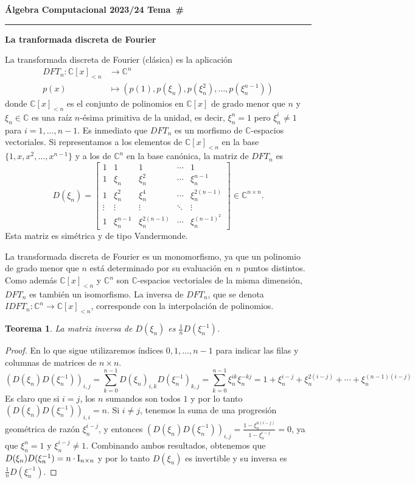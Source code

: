 \documentclass[a4paper, 11pt]{article}
\newcommand{\CC}{\mathbb{C}}
\newcounter{numerodetema}
\newcommand\tema[1]{{\eject\stepcounter{numerodetema}\bf Álgebra Computacional
2023/24 \hfill Tema~\#\arabic{numerodetema}}\par\smallskip\hrule\bigskip\par
\begin{center}{\Large\bf #1}\end{center}}
\theoremstyle{plain}
\newtheorem{teor}{Teorema}[numerodetema]
\theoremstyle{definition}
\begin{document}
\setcounter{numerodetema}{6}
\tema{La tranformada discreta de Fourier}

La transformada discreta de Fourier (clásica) es la aplicación
\[
\begin{aligned}
   DFT_n:\CC[x]_{<n} &\longrightarrow \CC^n \\
   p(x) & \mapsto \left(p(1),p(\xi_n),p(\xi_n^2),\ldots,p(\xi_n^{n-1})\right)
\end{aligned}
\]
donde $\CC[x]_{<n}$ es el conjunto de polinomios en $\CC[x]$ de grado menor
que $n$ y $\xi_n\in\CC$ es una raíz $n$-ésima primitiva de la unidad, es
decir, $\xi_n^n=1$ pero $\xi_n^i\neq 1$ para $i=1,\ldots,n-1$.
Es inmediato que $DFT_n$ es un morfismo de $\CC$-espacios vectoriales.
Si representamos a los elementos de $\CC[x]_{<n}$ en la base
$\{1,x,x^2,\ldots,x^{n-1}\}$ y a los de $\CC^n$ en la base canónica,
la matriz de $DFT_n$ es
\[
D(\xi_n)=
\left[
\begin{array}{ccccc}
1 & 1 & 1 & \cdots & 1 \\
1 & \xi_n & \xi_n^2 & \cdots & \xi_n^{n-1} \\
1 & \xi_n^2 & \xi_n^4 & \cdots & \xi_n^{2(n-1)} \\
\vdots & \vdots & \vdots & \ddots & \vdots \\
1 & \xi_n^{n-1} & \xi_n^{2(n-1)} & \cdots & \xi_n^{(n-1)^2}
\end{array}
\right]\in\CC^{n\times n}.
\]
Esta matriz es simétrica y de tipo Vandermonde.

\bigskip

La transformada discreta de Fourier es un monomorfismo, ya que un polinomio
de grado menor que $n$ está determinado por su evaluación en $n$ puntos
distintos. Como además $\CC[x]_{<n}$ y $\CC^n$ son $\CC$-espacios vectoriales
de la misma dimensión, $DFT_n$ es también un isomorfismo. La inversa de
$DFT_n$, que se denota $IDFT_n:\CC^n\longrightarrow\CC[x]_{<n}$,
corresponde con la interpolación de polinomios.

\begin{teor}\label{teor-dft}
La matriz inversa de $D(\xi_n)$ es $\frac1nD(\xi_n^{-1})$.
\end{teor}
\begin{proof}
En lo que sigue utilizaremos índices $0,1,\ldots,n-1$ para indicar las filas y
columnas de matrices de $n\times n$.
\[
 (D(\xi_n)D(\xi_n^{-1}))_{i,j}=\sum_{k=0}^{n-1}D(\xi_n)_{i,k}D(\xi_n^{-1})_{k,j}=
 \sum_{k=0}^{n-1}\xi_n^{ik}\xi_n^{-kj}=
 1+\xi_n^{i-j}+\xi_n^{2(i-j)}+\cdots+\xi_n^{(n-1)(i-j)}
\]
Es claro que si $i=j$, los $n$ sumandos son todos $1$ y por lo tanto
$(D(\xi_n)D(\xi_n^{-1}))_{i,i}=n$. Si $i\neq j$, tenemos la suma
de una progresión geométrica de razón $\xi_n^{i-j}$, y entonces
$(D(\xi_n)D(\xi_n^{-1}))_{i,j}=\frac{1-\xi_n^{n(i-j)}}{1-\xi_n^{i-j}}=0$,
ya que $\xi_n^n=1$ y $\xi_n^{i-j}\neq 1$.
Combinando ambos resultados, obtenemos que $D(\xi_n)D(\xi_n^{-1})=
n\cdot {\rm I}_{n\times n}$ y por lo tanto $D(\xi_n)$ es invertible y su
inversa es $\frac1nD(\xi_n^{-1})$.
\end{proof}
\end{document}
